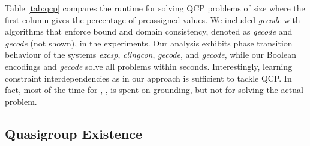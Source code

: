 \documentclass{tlp}
\newcommand{\systemname}[1]{\emph{#1}}
\begin{document}
Table \ref{tab:qcp} compares the runtime for solving QCP problems of size  where the first column gives the percentage of preassigned values. We included \systemname{gecode} with algorithms that enforce bound and domain consistency, denoted as \systemname{gecode} and \systemname{gecode} (not shown), in the experiments. Our analysis exhibits phase transition behaviour of the systems \systemname{ezcsp}, \systemname{clingcon}, \systemname{gecode}, and \systemname{gecode}, while our Boolean encodings and \systemname{gecode} solve all problems within seconds. Interestingly, learning constraint interdependencies as in our approach is sufficient to tackle QCP. In fact, most of the time for , ,  is spent on grounding, but not for solving the actual problem.


\subsection{Quasigroup Existence}
\end{document}
